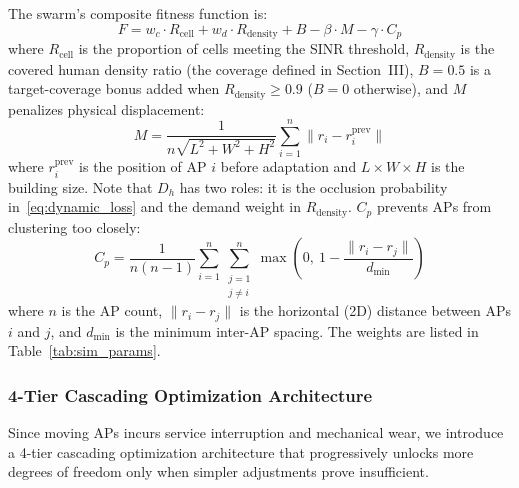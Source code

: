 \documentclass[conference]{IEEEtran}
\begin{document}
	The swarm's composite fitness function is:
	\begin{equation}
		F = w_c \cdot R_{\text{cell}} + w_d \cdot R_{\text{density}} + B -
		\beta \cdot M - \gamma \cdot C_p
		\label{eq:fitness}
	\end{equation}
	where $R_{\text{cell}}$ is the proportion of cells meeting the SINR
	threshold, $R_{\text{density}}$ is the covered human density ratio (the coverage defined in Section~III), $B = 0.5$ is
	a target-coverage bonus added when $R_{\text{density}} \ge 0.9$ ($B = 0$ otherwise), and $M$ penalizes physical displacement:
	\begin{equation}
		M = \frac{1}{n\sqrt{L^2 + W^2 + H^2}} \sum_{i=1}^{n} \|r_i - r_i^{\text{prev}}\|
		\label{eq:movement}
	\end{equation}
	where $r_i^{\text{prev}}$ is the position of AP $i$ before adaptation and $L \times W \times H$ is the building size. Note that $D_h$ has two roles: it is the occlusion probability in~\eqref{eq:dynamic_loss} and the demand weight in $R_{\text{density}}$. $C_p$
	prevents APs from clustering too closely:
	\begin{equation}
		C_p = \frac{1}{n(n-1)} \sum_{i=1}^{n}\sum_{\substack{j=1 \\ j \ne
				i}}^{n} \max\left(0,\ 1 - \frac{\|r_i - r_j\|}{d_{\min}}\right)
		\label{eq:clustering_penalty}
	\end{equation}
	where $n$ is the AP count, $\|r_i - r_j\|$ is the horizontal (2D) distance between APs $i$ and $j$, and $d_{\min}$ is
	the minimum inter-AP spacing. The weights are listed in Table~\ref{tab:sim_params}.

	\subsubsection{4-Tier Cascading Optimization Architecture}

	Since moving APs incurs service interruption and mechanical wear, we introduce a 4-tier cascading optimization architecture that progressively unlocks more degrees of freedom only when simpler adjustments prove insufficient.
\end{document}
